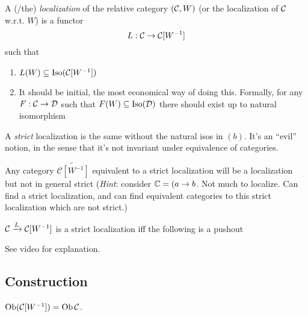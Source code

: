 \documentclass[../MH_Total.tex]{subfiles}
\begin{document}
\begin{definition}
	A (/the) \emph{localization} of the relative category $(\mathcal{C},W)$ (or the localization of $\mathcal{C}$ w.r.t. $W$) is a functor
	\[
	L: \mathcal{C} \to \mathcal{C}[W^{-1}]
	\]
	such that
	\begin{enumerate}
		\item $L(W) \subseteq \operatorname{Iso}(\mathcal{C}[W^{-1}])$
		\item It should be initial, the most economical way of doing this. Formally, for any $F: \mathcal{C} \to \mathcal{D}$ such that $F(W) \subseteq \operatorname{Iso}(\mathcal{D})$ there should exist up to natural isomorphism
		\begin{center}
		\end{center}
	\end{enumerate}
	A \emph{strict} localization is the same without the natural isos in $(b)$. It's an ``evil'' notion, in the sense that it's not invariant under equivalence of categories.
\end{definition}

	\begin{exercise}
	Any category $\widetilde{\mathcal{C}[W^{-1}]}$ equivalent to a strict localization will be a localization but not in general strict (\emph{Hint}: consider $\mathbb{C} = (a \to b$. Not much to localize. Can find a strict localization, and can find equivalent categories to this strict localization which are not strict.)
	\end{exercise}

\begin{remark}
	$\mathcal{C} \xrightarrow{L} \mathcal{C}[W^{-1}]$ is a strict localization iff the following is a pushout 
	\begin{center}
	\end{center}
	See video for explanation. 
\end{remark}

\subsection{Construction}
$\operatorname{Ob}(\mathcal{C}[W^{-1}]) = \operatorname{Ob}\mathcal{C}$. 
\end{document}
